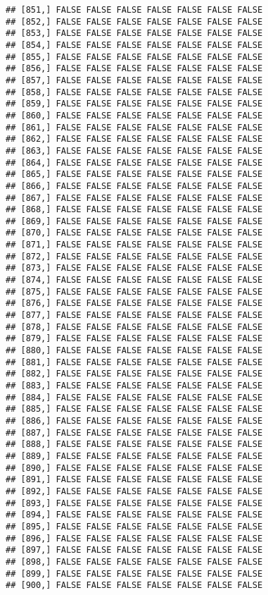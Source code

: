 \documentclass[
]{article}
\begin{document}
\begin{verbatim}
## [851,] FALSE FALSE FALSE FALSE FALSE FALSE FALSE
## [852,] FALSE FALSE FALSE FALSE FALSE FALSE FALSE
## [853,] FALSE FALSE FALSE FALSE FALSE FALSE FALSE
## [854,] FALSE FALSE FALSE FALSE FALSE FALSE FALSE
## [855,] FALSE FALSE FALSE FALSE FALSE FALSE FALSE
## [856,] FALSE FALSE FALSE FALSE FALSE FALSE FALSE
## [857,] FALSE FALSE FALSE FALSE FALSE FALSE FALSE
## [858,] FALSE FALSE FALSE FALSE FALSE FALSE FALSE
## [859,] FALSE FALSE FALSE FALSE FALSE FALSE FALSE
## [860,] FALSE FALSE FALSE FALSE FALSE FALSE FALSE
## [861,] FALSE FALSE FALSE FALSE FALSE FALSE FALSE
## [862,] FALSE FALSE FALSE FALSE FALSE FALSE FALSE
## [863,] FALSE FALSE FALSE FALSE FALSE FALSE FALSE
## [864,] FALSE FALSE FALSE FALSE FALSE FALSE FALSE
## [865,] FALSE FALSE FALSE FALSE FALSE FALSE FALSE
## [866,] FALSE FALSE FALSE FALSE FALSE FALSE FALSE
## [867,] FALSE FALSE FALSE FALSE FALSE FALSE FALSE
## [868,] FALSE FALSE FALSE FALSE FALSE FALSE FALSE
## [869,] FALSE FALSE FALSE FALSE FALSE FALSE FALSE
## [870,] FALSE FALSE FALSE FALSE FALSE FALSE FALSE
## [871,] FALSE FALSE FALSE FALSE FALSE FALSE FALSE
## [872,] FALSE FALSE FALSE FALSE FALSE FALSE FALSE
## [873,] FALSE FALSE FALSE FALSE FALSE FALSE FALSE
## [874,] FALSE FALSE FALSE FALSE FALSE FALSE FALSE
## [875,] FALSE FALSE FALSE FALSE FALSE FALSE FALSE
## [876,] FALSE FALSE FALSE FALSE FALSE FALSE FALSE
## [877,] FALSE FALSE FALSE FALSE FALSE FALSE FALSE
## [878,] FALSE FALSE FALSE FALSE FALSE FALSE FALSE
## [879,] FALSE FALSE FALSE FALSE FALSE FALSE FALSE
## [880,] FALSE FALSE FALSE FALSE FALSE FALSE FALSE
## [881,] FALSE FALSE FALSE FALSE FALSE FALSE FALSE
## [882,] FALSE FALSE FALSE FALSE FALSE FALSE FALSE
## [883,] FALSE FALSE FALSE FALSE FALSE FALSE FALSE
## [884,] FALSE FALSE FALSE FALSE FALSE FALSE FALSE
## [885,] FALSE FALSE FALSE FALSE FALSE FALSE FALSE
## [886,] FALSE FALSE FALSE FALSE FALSE FALSE FALSE
## [887,] FALSE FALSE FALSE FALSE FALSE FALSE FALSE
## [888,] FALSE FALSE FALSE FALSE FALSE FALSE FALSE
## [889,] FALSE FALSE FALSE FALSE FALSE FALSE FALSE
## [890,] FALSE FALSE FALSE FALSE FALSE FALSE FALSE
## [891,] FALSE FALSE FALSE FALSE FALSE FALSE FALSE
## [892,] FALSE FALSE FALSE FALSE FALSE FALSE FALSE
## [893,] FALSE FALSE FALSE FALSE FALSE FALSE FALSE
## [894,] FALSE FALSE FALSE FALSE FALSE FALSE FALSE
## [895,] FALSE FALSE FALSE FALSE FALSE FALSE FALSE
## [896,] FALSE FALSE FALSE FALSE FALSE FALSE FALSE
## [897,] FALSE FALSE FALSE FALSE FALSE FALSE FALSE
## [898,] FALSE FALSE FALSE FALSE FALSE FALSE FALSE
## [899,] FALSE FALSE FALSE FALSE FALSE FALSE FALSE
## [900,] FALSE FALSE FALSE FALSE FALSE FALSE FALSE

\end{verbatim}
\end{document}
